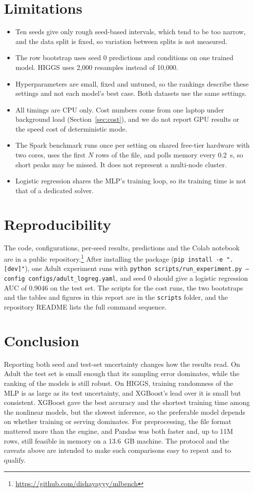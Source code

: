 \documentclass[conference]{IEEEtran}
\begin{document}
\section{Limitations}
\begin{itemize}
\item Ten seeds give only rough seed-based intervals, which tend to be too narrow, and the data split is fixed, so variation between splits is not measured.
\item The row bootstrap uses seed 0 predictions and conditions on one trained model. HIGGS uses 2{,}000 resamples instead of 10{,}000.
\item Hyperparameters are small, fixed and untuned, so the rankings describe these settings and not each model's best case. Both datasets use the same settings.
\item All timings are CPU only. Cost numbers come from one laptop under background load (Section~\ref{sec:cost}), and we do not report GPU results or the speed cost of deterministic mode.
\item The Spark benchmark runs once per setting on shared free-tier hardware with two cores, uses the first $N$ rows of the file, and polls memory every 0.2~s, so short peaks may be missed. It does not represent a multi-node cluster.
\item Logistic regression shares the MLP's training loop, so its training time is not that of a dedicated solver.
\end{itemize}

\section{Reproducibility}
The code, configurations, per-seed results, predictions and the Colab notebook are in a public repository.\footnote{\url{https://github.com/dishayayyy/mlbench}} After installing the package (\texttt{pip install -e ".[dev]"}), one Adult experiment runs with \texttt{python scripts/run\_experiment.py --config configs/adult\_logreg.yaml}, and seed 0 should give a logistic regression AUC of 0.9046 on the test set. The scripts for the cost runs, the two bootstraps and the tables and figures in this report are in the \texttt{scripts} folder, and the repository README lists the full command sequence.

\section{Conclusion}
Reporting both seed and test-set uncertainty changes how the results read. On Adult the test set is small enough that its sampling error dominates, while the ranking of the models is still robust. On HIGGS, training randomness of the MLP is as large as its test uncertainty, and XGBoost's lead over it is small but consistent. XGBoost gave the best accuracy and the shortest training time among the nonlinear models, but the slowest inference, so the preferable model depends on whether training or serving dominates. For preprocessing, the file format mattered more than the engine, and Pandas was both faster and, up to 11M rows, still feasible in memory on a 13.6~GB machine. The protocol and the caveats above are intended to make such comparisons easy to repeat and to qualify.
\end{document}

